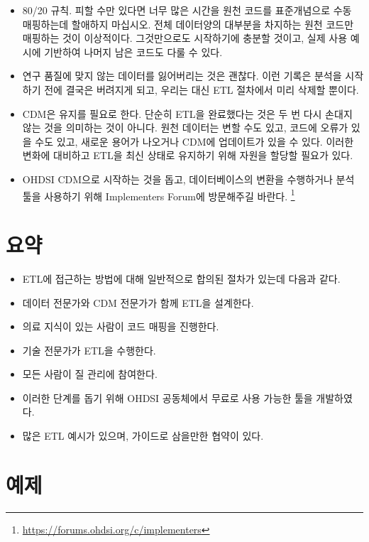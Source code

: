 \documentclass[10.5pt]{book}
\providecommand{\tightlist}{%
  \setlength{\itemsep}{0pt}\setlength{\parskip}{0pt}}
\let\rmarkdownfootnote\footnote%
\def\footnote{\protect\rmarkdownfootnote}
\theoremstyle{definition}
\theoremstyle{definition}
\theoremstyle{definition}
\theoremstyle{remark}
\let\BeginKnitrBlock\begin \let\EndKnitrBlock\end
\begin{document}
\begin{itemize}
\tightlist
\item
  80/20 규칙. 피할 수만 있다면 너무 많은 시간을 원천 코드를 표준개념으로
  수동 매핑하는데 할애하지 마십시오. 전체 데이터양의 대부분을 차지하는
  원천 코드만 매핑하는 것이 이상적이다. 그것만으로도 시작하기에 충분할
  것이고, 실제 사용 예시에 기반하여 나머지 남은 코드도 다룰 수 있다.
\item
  연구 품질에 맞지 않는 데이터를 잃어버리는 것은 괜찮다. 이런 기록은
  분석을 시작하기 전에 결국은 버려지게 되고, 우리는 대신 ETL 절차에서
  미리 삭제할 뿐이다.
\item
  CDM은 유지를 필요로 한다. 단순히 ETL을 완료했다는 것은 두 번 다시
  손대지 않는 것을 의미하는 것이 아니다. 원천 데이터는 변할 수도 있고,
  코드에 오류가 있을 수도 있고, 새로운 용어가 나오거나 CDM에 업데이트가
  있을 수 있다. 이러한 변화에 대비하고 ETL을 최신 상태로 유지하기 위해
  자원을 할당할 필요가 있다.
\item
  OHDSI CDM으로 시작하는 것을 돕고, 데이터베이스의 변환을 수행하거나
  분석 툴을 사용하기 위해 Implementers Forum에 방문해주길 바란다.
  \footnote{\url{https://forums.ohdsi.org/c/implementers}}
\end{itemize}

\section{요약}\label{-4}

\BeginKnitrBlock{rmdsummary}
\begin{itemize}
\item
  ETL에 접근하는 방법에 대해 일반적으로 합의된 절차가 있는데 다음과
  같다.
\item
  데이터 전문가와 CDM 전문가가 함께 ETL을 설계한다.
\item
  의료 지식이 있는 사람이 코드 매핑을 진행한다.
\item
  기술 전문가가 ETL을 수행한다.
\item
  모든 사람이 질 관리에 참여한다.
\item
  이러한 단계를 돕기 위해 OHDSI 공동체에서 무료로 사용 가능한 툴을
  개발하였다.
\item
  많은 ETL 예시가 있으며, 가이드로 삼을만한 협약이 있다.
\end{itemize}
\EndKnitrBlock{rmdsummary}

\section{예제}\label{-2}
\end{document}
